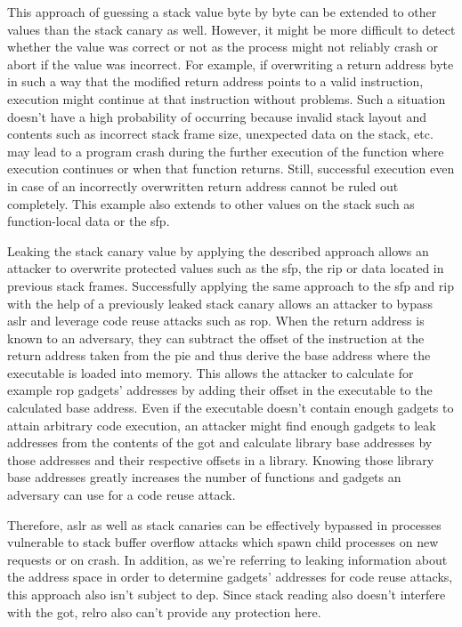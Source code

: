 This approach of guessing a stack value byte by byte can be extended to other values than the stack canary as well.
However, it might be more difficult to detect whether the value was correct or not as the process might not reliably crash or abort if the value was incorrect.
For example, if overwriting a return address byte in such a way that the modified return address points to a valid instruction, execution might continue at that instruction without problems.
Such a situation doesn't have a high probability of occurring because invalid stack layout and contents such as incorrect stack frame size, unexpected data on the stack, etc. may lead to a program crash during the further execution of the function where execution continues or when that function returns.
Still, successful execution even in case of an incorrectly overwritten return address cannot be ruled out completely.
This example also extends to other values on the stack such as function-local data or the \gls{sfp}.

Leaking the stack canary value by applying the described approach allows an attacker to overwrite protected values such as the \gls{sfp}, the \gls{rip} or data located in previous stack frames.
Successfully applying the same approach to the \gls{sfp} and \gls{rip} with the help of a previously leaked stack canary allows an attacker to bypass \gls{aslr} and leverage code reuse attacks such as \gls{rop}.
When the return address is known to an adversary, they can subtract the offset of the instruction at the return address taken from the \gls{pie} and thus derive the base address where the executable is loaded into memory.
This allows the attacker to calculate for example \gls{rop} gadgets' addresses by adding their offset in the executable to the calculated base address.
Even if the executable doesn't contain enough gadgets to attain arbitrary code execution, an attacker might find enough gadgets to leak addresses from the contents of the \gls{got} and calculate library base addresses by those addresses and their respective offsets in a library.
Knowing those library base addresses greatly increases the number of functions and gadgets an adversary can use for a code reuse attack.

Therefore, \gls{aslr} as well as stack canaries can be effectively bypassed in processes vulnerable to stack buffer overflow attacks which spawn child processes on new requests or on crash.
In addition, as we're referring to leaking information about the address space in order to determine gadgets' addresses for code reuse attacks, this approach also isn't subject to \gls{dep}.
Since stack reading also doesn't interfere with the \gls{got}, \gls{relro} also can't provide any protection here.

